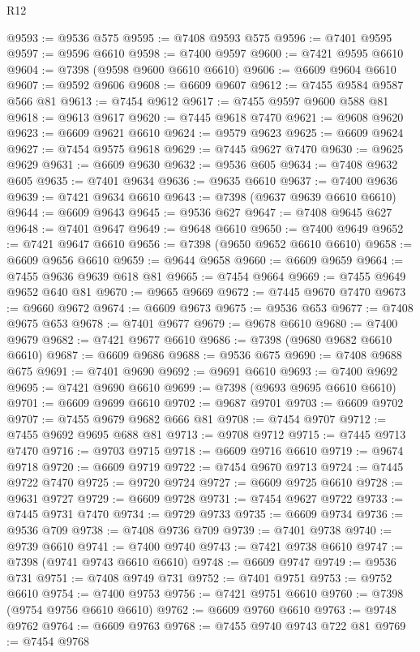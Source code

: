 \begin{lexlean}{R12}
\begin{coremodule}
{{{{{{{{{{{{{{{{{{{{{{{{{{{{{{{{{{{{{{{{{{{{{{{{{{{{{{{{{{{{{{{{{{{{{{{{{{{{{{{{{{@9593 := @9536 @575
@9595 := @7408 @9593 @575
@9596 := @7401 @9595
@9597 := @9596 @6610
@9598 := @7400 @9597
@9600 := @7421 @9595 @6610
@9604 := @7398 (@9598 @9600 @6610 @6610)
@9606 := @6609 @9604 @6610
@9607 := @9592 @9606
@9608 := @6609 @9607
@9612 := @7455 @9584 @9587 @566 @81
@9613 := @7454 @9612
@9617 := @7455 @9597 @9600 @588 @81
@9618 := @9613 @9617
@9620 := @7445 @9618 @7470
@9621 := @9608 @9620
@9623 := @6609 @9621 @6610
@9624 := @9579 @9623
@9625 := @6609 @9624
@9627 := @7454 @9575 @9618
@9629 := @7445 @9627 @7470
@9630 := @9625 @9629
@9631 := @6609 @9630
@9632 := @9536 @605
@9634 := @7408 @9632 @605
@9635 := @7401 @9634
@9636 := @9635 @6610
@9637 := @7400 @9636
@9639 := @7421 @9634 @6610
@9643 := @7398 (@9637 @9639 @6610 @6610)
@9644 := @6609 @9643
@9645 := @9536 @627
@9647 := @7408 @9645 @627
@9648 := @7401 @9647
@9649 := @9648 @6610
@9650 := @7400 @9649
@9652 := @7421 @9647 @6610
@9656 := @7398 (@9650 @9652 @6610 @6610)
@9658 := @6609 @9656 @6610
@9659 := @9644 @9658
@9660 := @6609 @9659
@9664 := @7455 @9636 @9639 @618 @81
@9665 := @7454 @9664
@9669 := @7455 @9649 @9652 @640 @81
@9670 := @9665 @9669
@9672 := @7445 @9670 @7470
@9673 := @9660 @9672
@9674 := @6609 @9673
@9675 := @9536 @653
@9677 := @7408 @9675 @653
@9678 := @7401 @9677
@9679 := @9678 @6610
@9680 := @7400 @9679
@9682 := @7421 @9677 @6610
@9686 := @7398 (@9680 @9682 @6610 @6610)
@9687 := @6609 @9686
@9688 := @9536 @675
@9690 := @7408 @9688 @675
@9691 := @7401 @9690
@9692 := @9691 @6610
@9693 := @7400 @9692
@9695 := @7421 @9690 @6610
@9699 := @7398 (@9693 @9695 @6610 @6610)
@9701 := @6609 @9699 @6610
@9702 := @9687 @9701
@9703 := @6609 @9702
@9707 := @7455 @9679 @9682 @666 @81
@9708 := @7454 @9707
@9712 := @7455 @9692 @9695 @688 @81
@9713 := @9708 @9712
@9715 := @7445 @9713 @7470
@9716 := @9703 @9715
@9718 := @6609 @9716 @6610
@9719 := @9674 @9718
@9720 := @6609 @9719
@9722 := @7454 @9670 @9713
@9724 := @7445 @9722 @7470
@9725 := @9720 @9724
@9727 := @6609 @9725 @6610
@9728 := @9631 @9727
@9729 := @6609 @9728
@9731 := @7454 @9627 @9722
@9733 := @7445 @9731 @7470
@9734 := @9729 @9733
@9735 := @6609 @9734
@9736 := @9536 @709
@9738 := @7408 @9736 @709
@9739 := @7401 @9738
@9740 := @9739 @6610
@9741 := @7400 @9740
@9743 := @7421 @9738 @6610
@9747 := @7398 (@9741 @9743 @6610 @6610)
@9748 := @6609 @9747
@9749 := @9536 @731
@9751 := @7408 @9749 @731
@9752 := @7401 @9751
@9753 := @9752 @6610
@9754 := @7400 @9753
@9756 := @7421 @9751 @6610
@9760 := @7398 (@9754 @9756 @6610 @6610)
@9762 := @6609 @9760 @6610
@9763 := @9748 @9762
@9764 := @6609 @9763
@9768 := @7455 @9740 @9743 @722 @81
@9769 := @7454 @9768
}}}}}}}}}}}}}}}}}}}}}}}}}}}}}}}}}}}}}}}}}}}}}}}}}}}}}}}}}}}}}}}}}}}}}}}}}}}}}}}}}}
\end{coremodule}
\end{lexlean}
